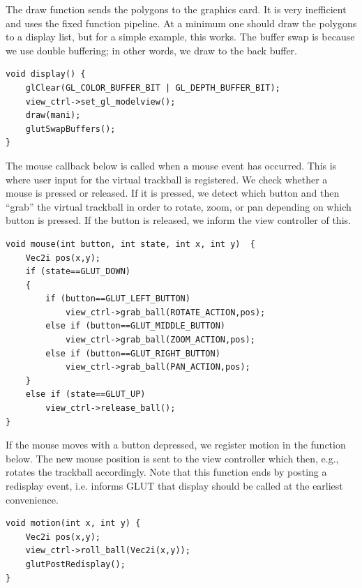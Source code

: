 \documentclass[a4paper]{article}
\begin{document}
The draw function sends the polygons to the graphics card. It is very inefficient and uses the fixed function pipeline. At a minimum one should draw the polygons to a display list, but for a simple example, this works. The buffer swap is because we use double buffering; in other words, we draw to the back buffer.
\begin{verbatim}
void display() {
    glClear(GL_COLOR_BUFFER_BIT | GL_DEPTH_BUFFER_BIT);
    view_ctrl->set_gl_modelview();
    draw(mani);
    glutSwapBuffers();
}

\end{verbatim}
The mouse callback below is called when a mouse event has occurred. This is where user input  for the virtual trackball is registered. We check whether a mouse is pressed or released. If it is pressed, we detect which button and then ``grab'' the virtual trackball in order to rotate, zoom, or pan depending on which button is pressed. If the button is released, we inform the view controller of this.
\begin{verbatim}
void mouse(int button, int state, int x, int y)  {
    Vec2i pos(x,y);
    if (state==GLUT_DOWN) 
    {
        if (button==GLUT_LEFT_BUTTON) 
            view_ctrl->grab_ball(ROTATE_ACTION,pos);
        else if (button==GLUT_MIDDLE_BUTTON) 
            view_ctrl->grab_ball(ZOOM_ACTION,pos);
        else if (button==GLUT_RIGHT_BUTTON) 
            view_ctrl->grab_ball(PAN_ACTION,pos);
    }
    else if (state==GLUT_UP)
        view_ctrl->release_ball();
}
\end{verbatim}
If the mouse moves with a button depressed, we register motion in the function below. The new mouse position is sent to the view controller
which then, e.g., rotates the trackball accordingly. Note that this function ends by posting a redisplay event, i.e. informs GLUT that display should be called at the earliest convenience.
\begin{verbatim}
void motion(int x, int y) {
    Vec2i pos(x,y);
    view_ctrl->roll_ball(Vec2i(x,y));
    glutPostRedisplay();
}
\end{verbatim}
\end{document}
